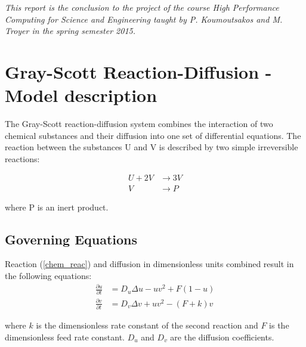 \documentclass[11pt,a4paper]{article} %
\begin{document}
\begin{minipage}{1.\textwidth}

\end{minipage}

\textit{This report is the conclusion to the project of the course High Performance Computing for Science and Engineering taught by P. Koumoutsakos and M. Troyer in the spring semester 2015.}



\section{Gray-Scott Reaction-Diffusion - Model description} 

The Gray-Scott reaction-diffusion system \cite{gray1983autocatalytic} combines the interaction of two chemical substances and their diffusion into one set of differential equations.
The reaction between the substances U and V is described by two simple irreversible reactions:

\begin{equation} \label{chem_reac}
\begin{aligned}
	U + 2V &\rightarrow 3V \\
	V &\rightarrow P
\end{aligned}
\end{equation} 

where P is an inert product. 

\subsection{Governing Equations}

Reaction (\ref{chem_reac}) and diffusion in dimensionless units combined result in the following equations:
\begin{equation} \label{reac_diff}
\begin{aligned}
\frac{\partial u}{\partial t} &= D_u \Delta u - uv^2 + F(1-u) \\
\frac{\partial v}{\partial t} &= D_v \Delta v + uv^2 - (F+k)v
\end{aligned}
\end{equation}

where $k$ is the dimensionless rate constant of the second reaction and $F$ is the dimensionless feed rate constant. 
$D_u$ and $D_v$ are the diffusion coefficients.
\end{document}
